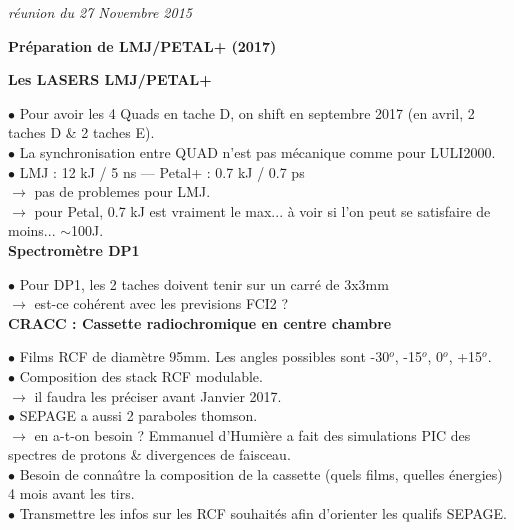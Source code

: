\documentclass{report}
\begin{document}
{\it
\noindent
r\'eunion du 27 Novembre 2015}

\bigskip

\begin{center}
{\large
\bf
Pr\'eparation de LMJ/PETAL+ (2017)\\[0.2cm]
}
{\it }
\end{center}

\bigskip

\noindent
{\bf Les LASERS LMJ/PETAL+}

\noindent $\bullet$ Pour avoir les 4 Quads en tache D, on shift en septembre 2017 (en avril, 2 taches D \& 2 taches E).\\
\noindent $\bullet$ La synchronisation entre QUAD n'est pas mécanique comme pour LULI2000.\\
\noindent $\bullet$ LMJ : 12 kJ / 5 ns --- Petal+ : 0.7 kJ / 0.7 ps\\
\noindent $\rightarrow$ pas de problemes pour LMJ.\\
\noindent $\rightarrow$ pour Petal, 0.7 kJ est vraiment le max... à voir si l'on peut se satisfaire de moins... $\sim$100J.\\


\noindent
{\bf Spectromètre DP1}

\noindent $\bullet$ Pour DP1, les 2 taches doivent tenir sur un carré de 3x3mm\\
\noindent $\rightarrow$ est-ce cohérent avec les previsions FCI2 ?\\


\noindent
{\bf CRACC : Cassette radiochromique en centre chambre}

\noindent $\bullet$ Films RCF de diamètre 95mm. Les angles possibles sont -30$^o$, -15$^o$, 0$^o$, +15$^o$.\\
\noindent $\bullet$ Composition des stack RCF modulable.\\
\noindent $\rightarrow$ il faudra les préciser avant Janvier 2017.\\
\noindent $\bullet$ SEPAGE a aussi 2 paraboles thomson.\\
\noindent $\rightarrow$ en a-t-on besoin ? Emmanuel d'Humière a fait des simulations PIC des spectres de protons \& divergences de faisceau.\\
\noindent $\bullet$ Besoin de conna\^{\i}tre la composition de la cassette (quels films, quelles énergies) 4 mois avant les tirs.\\
\noindent $\bullet$ Transmettre les infos sur les RCF souhaités afin d'orienter les qualifs SEPAGE.\\
\end{document}

